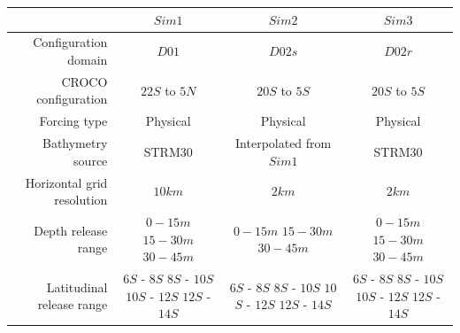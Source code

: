 \begin{table}[H]
\centering
\begin{tabular}{r|c|c|c}
\hline
                   &
    \textbf{$Sim 1$} &
    \textbf{$Sim 2$} &
    \textbf{$Sim 3$} \\
\hline
Configuration domain &
	$D01$  		     &
	$D02s$ 		     &
	$D02r$ 			 \\
CROCO configuration        			   &
	$22$\textdegree $S$ to $5$\textdegree $N$ &
	$20$\textdegree $S$ to $5$\textdegree $S$ &
	$20$\textdegree $S$ to $5$\textdegree $S$ \\
Forcing type &
	Physical &
	Physical &
	Physical \\
Bathymetry source                         &
	STRM30                                &
	\makecell{Interpolated\\from $Sim 1$} &
	STRM30 								 \\
Horizontal grid resolution &
	$10 km$                  &
	$2 km$                   &
	$2 km$                   \\
Depth release range            &
	\makecell{$0-15 m$ \\ $15-30 m$ \\ $30-45 m$}&
	\makecell{$0-15 m$ \\ $15-30 m$ \\ $30-45 m$}&
	\makecell{$0-15 m$ \\ $15-30 m$ \\ $30-45 m$}\\
Latitudinal release range            &
	\makecell{$6$\textdegree $S$ - $8$\textdegree $S$  \\
			  $8$\textdegree $S$ - $10$\textdegree $S$  \\
			  $10$\textdegree $S$ - $12$\textdegree $S$ \\
			  $12$\textdegree $S$ - $14$\textdegree $S$} &
	\makecell{$6$\textdegree $S$ - $8$\textdegree $S$   \\
			  $8$\textdegree $S$ - $10$\textdegree $S$  \\
			  $10$\textdegree $S$ - $12$\textdegree $S$ \\
			  $12$\textdegree $S$ - $14$\textdegree $S$} &
	\makecell{$6$\textdegree $S$ - $8$\textdegree $S$   \\
			  $8$\textdegree $S$ - $10$\textdegree $S$  \\
			  $10$\textdegree $S$ - $12$\textdegree $S$ \\
			  $12$\textdegree $S$ - $14$\textdegree $S$} \\

\end{tabular}
\end{table}
